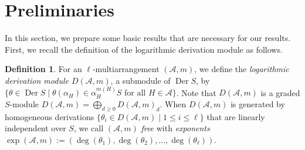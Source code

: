 \documentclass[12pt]{amsart}
\theoremstyle{definition}
\newtheorem{definition}{Definition}[section]
\newcommand{\AAA}{\mathcal{A}}
\newcommand{\Der}{\operatorname{Der}}
\begin{document}
\section{Preliminaries}\label{section:preliminary}
In this section, we prepare some basic results that are 
necessary for our results. 
First, we recall the definition of the logarithmic derivation module 
as follows. 
\begin{definition}\label{definition:derivation module}
    For an $\ell$-multiarrangement $(\AAA,m)$, we define the 
    \emph{logarithmic derivation module $D(\AAA,m)$}, 
    a submodule of $\Der S$, by 
    $\{\theta \in \Der S \mid \theta(\alpha_{H})\in\alpha_{H}^{m(H)}S 
    \text{ for all } H\in\AAA \}$. 
    Note that $D(\AAA,m)$ is a graded $S$-module 
    $D(\AAA,m)=\bigoplus_{d\geq0} D(\AAA,m)_d$. 
    When $D(\AAA,m)$ is generated by homogeneous derivations 
    $\{\theta_i \in D(\AAA,m) \mid 1 \leq i \leq \ell\}$ 
    that are linearly independent over $S$, we call 
    $(\AAA,m)$ \emph{free} with \emph{exponents} 
    $\exp(\AAA,m):=(\deg(\theta_1),\deg(\theta_2),\ldots,\deg(\theta_{\ell}) )$. 
\end{definition}
\end{document}
